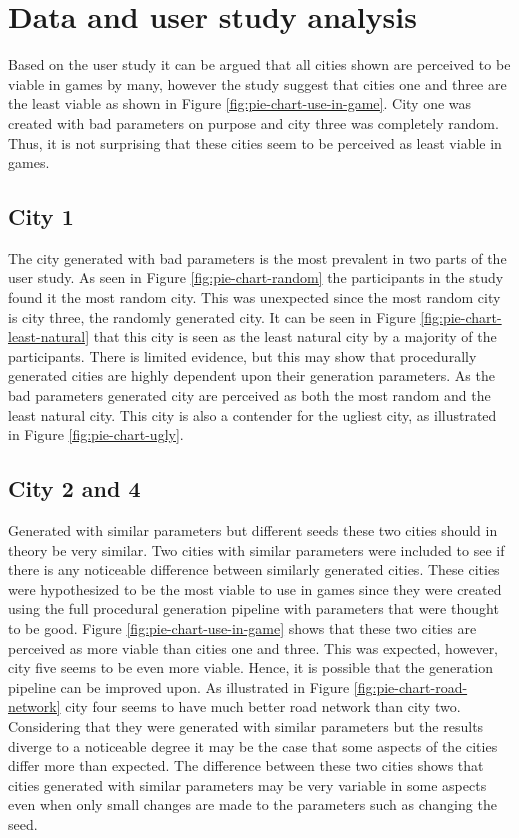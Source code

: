 \section{Data and user study analysis}
	Based on the user study it can be argued that all cities shown are perceived to be viable in games by many, however the study suggest that cities one and three are the least viable as shown in Figure \ref{fig:pie-chart-use-in-game}. City one was created with bad parameters on purpose and city three was completely random. Thus, it is not surprising that these cities seem to be perceived as least viable in games.
	
	\subsection{City 1}
		The city generated with bad parameters is the most prevalent in two parts of the user study. As seen in Figure \ref{fig:pie-chart-random} the participants in the study found it the most random city. This was unexpected since the most random city is city three, the randomly generated city. It can be seen in Figure \ref{fig:pie-chart-least-natural} that this city is seen as the least natural city by a majority of the participants. There is limited evidence, but this may show that procedurally generated cities are highly dependent upon their generation parameters. As the bad parameters generated city are perceived as both the most random and the least natural city. This city is also a contender for the ugliest city, as illustrated in Figure \ref{fig:pie-chart-ugly}.
		
	\subsection{City 2 and 4} \label{ssec:city2-3}
		Generated with similar parameters but different seeds these two cities should in theory be very similar. Two cities with similar parameters were included to see if there is any noticeable difference between similarly generated cities. These cities were hypothesized to be the most viable to use in games since they were created using the full procedural generation pipeline with parameters that were thought to be good. Figure \ref{fig:pie-chart-use-in-game} shows that these two cities are perceived as more viable than cities one and three. This was expected, however, city five seems to be even more viable. Hence, it is possible that the generation pipeline can be improved upon. As illustrated in Figure \ref{fig:pie-chart-road-network} city four seems to have much better road network than city two. Considering that they were generated with similar parameters but the results diverge to a noticeable degree it may be the case that some aspects of the cities differ more than expected. The difference between these two cities shows that cities generated with similar parameters may be very variable in some aspects even when only small changes are made to the parameters such as changing the seed.
